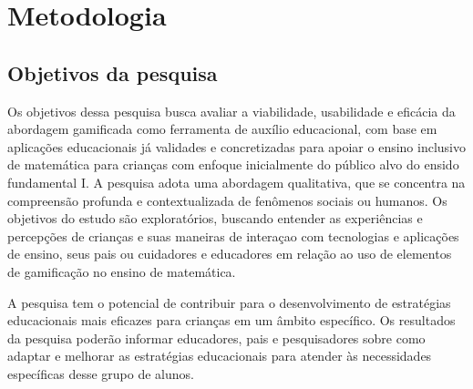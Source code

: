 

\chapter{Metodologia}\label{chp:met}


\section{Objetivos da pesquisa}
Os objetivos dessa pesquisa busca avaliar a viabilidade, usabilidade e eficácia da abordagem gamificada como ferramenta de auxílio educacional, com base em aplicações educacionais já validades e concretizadas para apoiar o ensino inclusivo de matemática para crianças com enfoque inicialmente do público alvo do ensido fundamental I. A pesquisa adota uma abordagem qualitativa, que se concentra na compreensão profunda e contextualizada de fenômenos sociais ou humanos. Os objetivos do estudo são exploratórios, buscando entender as experiências e percepções de crianças e suas maneiras de interaçao com tecnologias e aplicações de ensino, seus pais ou cuidadores e educadores em relação ao uso de elementos de gamificação no ensino de matemática.

A pesquisa tem o potencial de contribuir para o desenvolvimento de estratégias educacionais mais eficazes para crianças em um âmbito específico. Os resultados da pesquisa poderão informar educadores, pais e pesquisadores sobre como adaptar e melhorar as estratégias educacionais para atender às necessidades específicas desse grupo de alunos.

